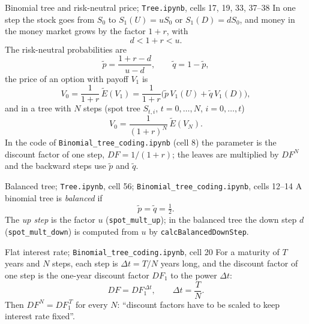 \documentclass[11pt,a4paper]{article}
\newcommand{\Et}{\tilde{E}}
\begin{document}
\begin{defbox}{Binomial tree and risk-neutral price; \texttt{Tree.ipynb}, cells 17, 19, 33, 37--38}
In one step the stock goes from $S_0$ to $S_1(U)=uS_0$ or $S_1(D)=dS_0$, and money in the money market grows by the factor $1+r$, with
\[
d<1+r<u .
\]
The risk-neutral probabilities are
\begin{equation}\label{eq:pq}
\tilde p=\frac{1+r-d}{u-d},\qquad \tilde q=1-\tilde p ,
\end{equation}
the price of an option with payoff $V_1$ is
\begin{equation}\label{eq:V0}
V_0=\frac{1}{1+r}\,\Et(V_1)=\frac{1}{1+r}\bigl(\tilde p\,V_1(U)+\tilde q\,V_1(D)\bigr),
\end{equation}
and in a tree with $N$ steps (spot tree $S_{t,i}$, $t=0,\dots,N$, $i=0,\dots,t$)
\begin{equation}\label{eq:VN}
V_0=\frac{1}{(1+r)^N}\,\Et(V_N).
\end{equation}
In the code of \texttt{Binomial\_tree\_coding.ipynb} (cell 8) the parameter is the discount factor of one step, $DF=1/(1+r)$; the leaves are multiplied by $DF^N$ and the backward steps use $\tilde p$ and $\tilde q$.
\end{defbox}

\begin{defbox}{Balanced tree; \texttt{Tree.ipynb}, cell 56; \texttt{Binomial\_tree\_coding.ipynb}, cells 12--14}
A binomial tree is \emph{balanced} if
\begin{equation}\label{eq:bal}
\tilde p=\tilde q=\tfrac12 .
\end{equation}
The \emph{up step} is the factor $u$ (\texttt{spot\_mult\_up}); in the balanced tree the down step $d$ (\texttt{spot\_mult\_down}) is computed from $u$ by \texttt{calcBalancedDownStep}.
\end{defbox}

\begin{defbox}{Flat interest rate; \texttt{Binomial\_tree\_coding.ipynb}, cell 20}
For a maturity of $T$ years and $N$ steps, each step is $\Delta t=T/N$ years long, and the discount factor of one step is the one-year discount factor $DF_1$ to the power $\Delta t$:
\begin{equation}\label{eq:flat}
DF=DF_1^{\,\Delta t},\qquad \Delta t=\frac{T}{N}.
\end{equation}
Then $DF^N=DF_1^{\,T}$ for every $N$: ``discount factors have to be scaled to keep interest rate fixed''.
\end{defbox}
\end{document}
